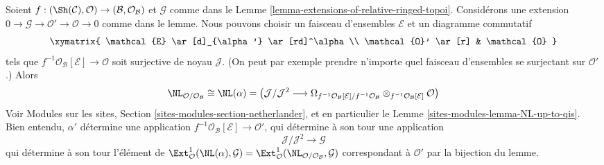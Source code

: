 \begin{remark}
\label{remark-extensions-of-relative-ringed-topoi}
Soient $f : (\Sh(\mathcal{C}), \mathcal{O}) \to
(\mathcal{B}, \mathcal{O}_\mathcal{B})$ et $\mathcal{G}$ comme dans le
Lemme \ref{lemma-extensions-of-relative-ringed-topoi}.
Considérons une extension
$0 \to \mathcal{G} \to \mathcal{O}' \to \mathcal{O} \to 0$ comme dans le
lemme. Nous pouvons choisir un faisceau d'ensembles $\mathcal{E}$ et un
diagramme commutatif
$$
\xymatrix{
\mathcal{E} \ar[d]_{\alpha'} \ar[rd]^\alpha \\
\mathcal{O}' \ar[r] & \mathcal{O}
}
$$
tels que $f^{-1}\mathcal{O}_\mathcal{B}[\mathcal{E}] \to \mathcal{O}$ soit
surjective de noyau $\mathcal{J}$.
(On peut par exemple prendre n'importe quel faisceau d'ensembles se surjectant
sur $\mathcal{O}'$.) Alors
$$
\NL_{\mathcal{O}/\mathcal{O}_\mathcal{B}} \cong \NL(\alpha) = 
\left(
\mathcal{J}/\mathcal{J}^2
\longrightarrow
\Omega_{f^{-1}\mathcal{O}_\mathcal{B}[\mathcal{E}]/
f^{-1}\mathcal{O}_\mathcal{B}}
\otimes_{f^{-1}\mathcal{O}_\mathcal{B}[\mathcal{E}]} \mathcal{O}\right)
$$
Voir Modules sur les sites,
Section \ref{sites-modules-section-netherlander}, et en particulier le
Lemme \ref{sites-modules-lemma-NL-up-to-qis}.
Bien entendu, $\alpha'$ détermine une application
$f^{-1}\mathcal{O}_\mathcal{B}[\mathcal{E}] \to \mathcal{O}'$, qui détermine
à son tour une application
$$
\mathcal{J}/\mathcal{J}^2 \longrightarrow \mathcal{G}
$$
qui détermine à son tour l'élément de
$\Ext^1_\mathcal{O}(\NL(\alpha), \mathcal{G}) =
\Ext^1_\mathcal{O}(\NL_{\mathcal{O}/\mathcal{O}_\mathcal{B}}, \mathcal{G})$
correspondant à $\mathcal{O}'$ par la bijection du lemme.
\end{remark}

